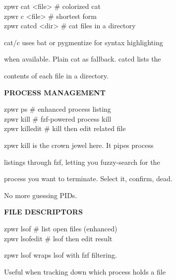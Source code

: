 \documentclass[11pt,a4paper,twoside]{book}
\begin{document}
\begin{codebox}
zpwr cat <file>                     \# colorized cat\\
zpwr c <file>                       \# shortest form\\
zpwr catcd <dir>                    \# cat files in a directory\\
\end{codebox}

cat/c uses bat or pygmentize for syntax highlighting

when available. Plain cat as fallback. catcd lists the

contents of each file in a directory.


\vspace{12pt}
{\bfseries\color{neonyellow} PROCESS MANAGEMENT}\vspace{4pt}

\begin{codebox}
zpwr ps                             \# enhanced process listing\\
zpwr kill                           \# fzf-powered process kill\\
zpwr killedit                       \# kill then edit related file\\
\end{codebox}

\begin{codebox}
zpwr kill is the crown jewel here. It pipes process\\
\end{codebox}

listings through fzf, letting you fuzzy-search for the

process you want to terminate. Select it, confirm, dead.

No more guessing PIDs.


\vspace{12pt}
{\bfseries\color{neonyellow} FILE DESCRIPTORS}\vspace{4pt}

\begin{codebox}
zpwr lsof                           \# list open files (enhanced)\\
zpwr lsofedit                       \# lsof then edit result\\
\end{codebox}

zpwr lsof wraps lsof with fzf filtering.

Useful when tracking down which process holds a file
\end{document}
